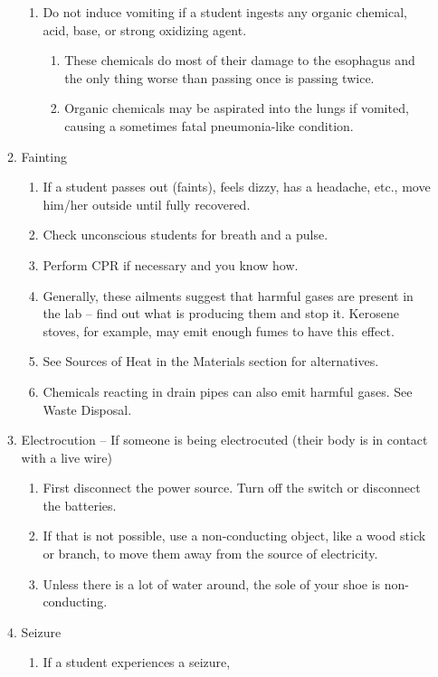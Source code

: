 \begin{enumerate}
\begin{enumerate}
\begin{enumerate}
\item{Do not induce vomiting if a student ingests any organic chemical, 
acid, base, or strong oxidizing agent.}
\begin{enumerate}
\item{These chemicals do most of their damage to the esophagus 
and the only thing worse than passing once is passing twice.}
\item{Organic chemicals may be aspirated into the lungs if vomited, 
causing a sometimes fatal pneumonia-like condition.}
\end{enumerate}

\end{enumerate}

\item{Fainting}
\begin{enumerate}
\item{If a student passes out (faints), feels dizzy, has a headache, etc., 
move him/her outside until fully recovered.}
\item{Check unconscious students for breath and a pulse.}
\item{Perform CPR if necessary and you know how.}
\item{Generally, these ailments suggest 
that harmful gases are present in the lab -- 
find out what is producing them and stop it. 
Kerosene stoves, for example, may emit enough fumes to have this effect.}
\item{See Sources of Heat in the Materials section for alternatives.}
\item{Chemicals reacting in drain pipes can also emit harmful gases. 
See Waste Disposal.}
\end{enumerate}
\item{Electrocution -- If someone is being electrocuted 
(their body is in contact with a live wire)}
\begin{enumerate}
\item{First disconnect the power source. 
Turn off the switch or disconnect the batteries.}
\item{If that is not possible, use a non-conducting object, 
like a wood stick or branch, to move them away from the source of electricity.}
\item{Unless there is a lot of water around, 
the sole of your shoe is non-conducting.}
\end{enumerate}
\item{Seizure}
\begin{enumerate}
\item{If a student experiences a seizure, 
}
\end{enumerate}
\end{enumerate}
\end{enumerate}

